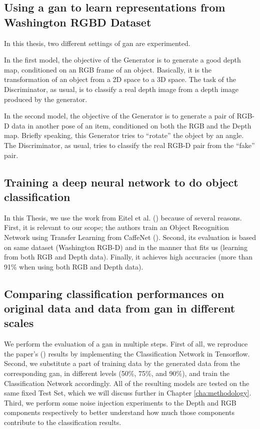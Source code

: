 \subsection{Using a \acrshort{gan} to learn representations from Washington RGBD Dataset} 
In this thesis, two different settings of \acrshort{gan} are experimented. 

In the first model, the objective of the Generator is to generate a good depth map,
conditioned on an RGB frame of an object. Basically, it is the transformation of an object
from a 2D space to a 3D space. The task of the Discriminator, as usual, is to classify a
real depth image from a depth image produced by the generator.

In the second model, the objective of the Generator is to generate a pair of RGB-D data in
another pose of an item, conditioned on both the RGB and the Depth map. Briefly speaking,
this Generator tries to ``rotate'' the object by an angle. The Discriminator, as usual,
tries to classify the real RGB-D pair from the ``fake'' pair.

\subsection{Training a deep neural network to do object classification}
In this Thesis, we use the work from Eitel et al. () because of several
reasons. First, it is relevant to our scope; the authors train an Object Recognition
Network using Transfer Learning from CaffeNet (). Second, its
evaluation is based on same dataset (Washington RGB-D) and in the manner that fits us
(learning from both RGB and Depth data). Finally, it achieves high accuracies (more than
91\% when using both RGB and Depth data).

\subsection{Comparing classification performances on original data and data from
	\acrshort{gan} in different scales}
We perform the evaluation of a \acrshort{gan} in multiple steps. First of all, we
reproduce the paper's () results by implementing the Classification
Network in Tensorflow.  Second, we substitute a part of training data by the generated
data from the corresponding \acrshort{gan}, in different levels (50\%, 75\%, and 90\%),
and train the Classification Network accordingly. All of the resulting models are tested
on the same fixed Test Set, which we will discuss further in Chapter
\ref{cha:methodology}. Third, we perform some noise injection experiments to the Depth and
RGB components respectively to better understand how much those components contribute to
the classification results.

